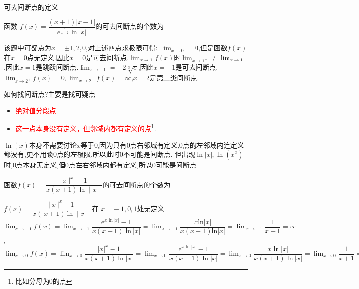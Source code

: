 \documentclass[8pt a4paper, oneside, UTF8]{ctexbook}
\begin{document}
\begin{sloppypar}
\begin{defn}{可去间断点的定义}{}
\begin{center}
\begin{tikzpicture}[x=0.5pt,y=0.5pt,yscale=-1,xscale=1]
            \end{tikzpicture}
        \end{center}
    \end{defn}
    \begin{problem}
    函数 $f\left(x\right)=\dfrac{(x+1)|x-1|}{e^{\frac{1}{x-2}}\ln|x|}$的可去间断点的个数为
    \end{problem}
    \begin{solution}
        该题中可疑点为$x = \pm 1,2,0$,对上述四点求极限可得:
        $\lim_{x\to 0}=0$,但是函数$f(x)$在$x=0$点无定义.因此$x=0$是可去间断点.$\lim_{x\to 1}f(x)$时$\lim_{x\to1^+}\neq \lim_{x\to 1^-}$.因此$x=1$是跳跃间断点.$\lim_{x\to -1}=-2\sqrt[3]{e}$,因此$x=-1$是可去间断点.$\lim_{x\to2^+}f(x)=0,\lim_{x\to2^-}f(x)=\infty$,$x=2$是第二类间断点.
    \end{solution}
    \begin{note}
        如何找间断点?主要是找可疑点
        \begin{itemize}
            \item \textcolor{red}{绝对值分段点}
            \item \textcolor{red}{这一点本身没有定义，但邻域内都有定义的点}\footnote{比如分母为0的点}.
        \end{itemize}
        $\ln(x)$本身不需要讨论$x$等于$0$,因为只有$0$点右邻域有定义,$0$点的左邻域内连定义都没有,更不用谈$0$点的左极限,所以此时$0$不可能是间断点.
        但出现$\ln |x|,\ln(x^2)$时,$0$点本身无定义,但$0$点左右邻域内都有定义,所以$0$可能是间断点.
    \end{note}
    \begin{problem}
    函数$f(x)=\dfrac{\mid x\mid^{x}-1}{x(x+1)\ln\mid x\mid}$的可去间断点的个数为
    \end{problem}
    \begin{solution}
        $f(x)=\dfrac{\left|\:x\:\right|^{x}-1}{x(\:x+1)\ln\mid x\mid}\:$在 $x=-\:1,0,1$\:处无定义\:\\
        $\operatorname*{lim}_{x\to-1}f(x)=\operatorname*{lim}_{x\to-1}\dfrac{\mathrm{e}^{x\ln\left|x\right|}-1}{x(x+1)\ln\left|x\right|}=\operatorname*{lim}_{x\to-1}\dfrac{x\mathrm{ln}\left|x\right|}{x(x+1)\mathrm{ln}\left|x\right|}=\operatorname*{lim}_{x\to-1}\dfrac{1}{x+1}=\infty$, \\
        $\lim_{x\to0}f(x)=\lim_{x\to0}\dfrac{\left|x\right|^{x}-1}{x(x+1)\ln\left|x\right|}=\lim_{x\to0}\dfrac{\mathrm{e}^{x\ln\left|x\right|}-1}{x(x+1)\ln\left|x\right|}=\lim_{x\to0}\dfrac{x\ln\left|x\right|}{x(x+1)\ln\left|x\right|}=\lim_{x\to0}\dfrac{1}{x+1}=1\:, $\\

\end{solution}
\end{sloppypar}
\end{document}
